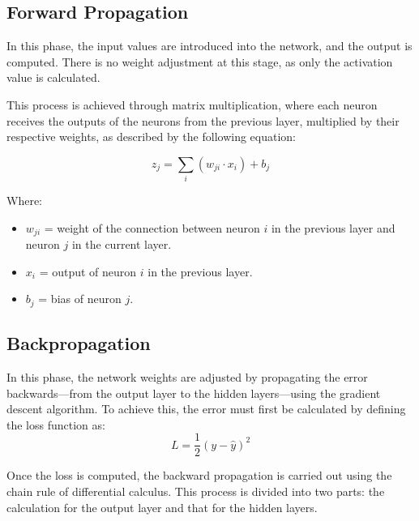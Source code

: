 \subsection{Forward Propagation} \label{ap:feed_forward}
In this phase, the input values are introduced into the network, and the output is computed.  
There is no weight adjustment at this stage, as only the activation value is calculated.

This process is achieved through matrix multiplication, where each neuron receives the outputs of the neurons from the previous layer, multiplied by their respective weights, as described by the following equation:

\[
z_j = \sum_{i} (w_{ji} \cdot x_i) + b_j
\]

Where:

\begin{itemize}
    \item $w_{ji}$ = weight of the connection between neuron $i$ in the previous layer and neuron $j$ in the current layer.
    \item $x_i$ = output of neuron $i$ in the previous layer.
    \item $b_j$ = bias of neuron $j$.
\end{itemize}

\subsection{Backpropagation} \label{ap:back_propagation}
In this phase, the network weights are adjusted by propagating the error backwards—from the output layer to the hidden layers—using the gradient descent algorithm.  
To achieve this, the error must first be calculated by defining the loss function as:  
\[
L = \frac{1}{2}(y - \hat{y})^2
\]

Once the loss is computed, the backward propagation is carried out using the chain rule of differential calculus.  
This process is divided into two parts: the calculation for the output layer and that for the hidden layers.

